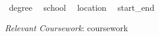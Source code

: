 

\begin{cventries}

  \cventry
    { {{~degree~}} } %
    { {{~school~}} } %
    { {{~location~}} } %
    { {{~start_end~}} } %
    {
      \begin{cvitems} %
        \item {\textit{Relevant Coursework}:}
        { {{{coursework}}} }
      \end{cvitems}
    }
\end{cventries}